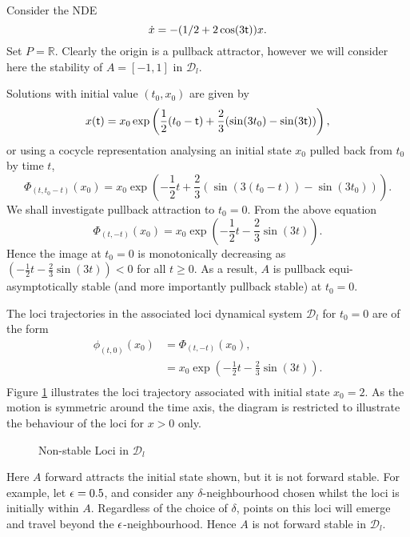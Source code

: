 \begin{eg}\label{egpstabprob}
Consider the NDE
\[ \dot{x} = -(1/2 + 2 \cos (3 \mathsf{\mathsf{t}}) ) x. \]
Set $P = \mathbb{R}$. Clearly the origin is a pullback attractor, however we
will consider here the stability of $A = [-1, 1]$ in $\mathcal{D}_l$.

Solutions with initial value $(t_0, x_0)$ are given by
\[ x( \mathsf{\mathsf{t}}) = x_0  \exp \left( \frac{1}{2}( t_0 -  \mathsf{\mathsf{t}}) + \frac{2}{3} (\sin(3t_0) -
            \sin(3 \mathsf{\mathsf{t}})) \right), \]
or using a cocycle representation analysing an initial state $x_0$
pulled back from $t_0$ by time $t$,
\[ \Phi_{(t, t_0 - t)}(x_0) = x_0 \exp \left( - \frac{1}{2} t + \frac{2}{3}
             (\sin(3(t_0 - t)) - \sin(3 t_0)) \right). \]
We shall investigate pullback attraction to $t_0 =
0$. From the above equation
\[ \Phi_{(t, -t)}(x_0) = x_0 \exp \left( -\frac{1}{2}t - \frac{2}{3} \sin(3t)
                  \right). \]
Hence the image at $t_0 = 0$ is monotonically decreasing as $( -\frac{1}{2}t -
\frac{2}{3} \sin(3t)) < 0$ for all $t \geq 0$. As a result, $A$ is pullback
equi-asymptotically stable (and more importantly pullback stable) at $t_0 = 0$.

The loci trajectories in the associated loci dynamical system $\mathcal{D}_l$
for $t_0 = 0$ are of the form
\begin{align*}
  \phi_{(t, 0)}(x_0) &= \Phi_{(t, -t)}(x_0), \\
    &= x_0 \exp \left( -\frac{1}{2}t - \frac{2}{3} \sin(3t) \right). \\
\end{align*}
Figure \ref{loci4} illustrates the loci trajectory associated with initial state
$x_0 = 2$.  As the motion is symmetric around the time axis, the
diagram is restricted to illustrate the behaviour of the loci for $x > 0$ only.

\begin{figure}[htb]
\begin{center}
 \caption{Non-stable Loci in $\mathcal{D}_l$}
\protect\label{loci4}
\end{center}
\end{figure}

Here $A$ forward attracts the initial state shown, but it is not forward
stable. For example, let $\epsilon = 0.5$, and consider any $\delta$-neighbourhood
chosen whilst the loci is initially within $A$. Regardless of the choice of
$\delta$, points on this loci will emerge and travel beyond the
$\epsilon$-neighbourhood. Hence $A$ is not forward stable in $\mathcal{D}_l$.
\end{eg}

